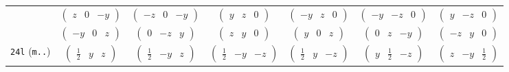 \documentclass[fleqn,9pt,landscape]{jsarticle}
\begin{document}
\begin{center}
\begin{longtable}{ccccccc}
& $ \begin{pmatrix} z & 0 & - y \end{pmatrix} $ & $ \begin{pmatrix} - z & 0 & - y \end{pmatrix} $ & $ \begin{pmatrix} y & z & 0 \end{pmatrix} $ & $ \begin{pmatrix} - y & z & 0 \end{pmatrix} $ & $ \begin{pmatrix} - y & - z & 0 \end{pmatrix} $ & $ \begin{pmatrix} y & - z & 0 \end{pmatrix} $ \\
& $ \begin{pmatrix} - y & 0 & z \end{pmatrix} $ & $ \begin{pmatrix} 0 & - z & y \end{pmatrix} $ & $ \begin{pmatrix} z & y & 0 \end{pmatrix} $ & $ \begin{pmatrix} y & 0 & z \end{pmatrix} $ & $ \begin{pmatrix} 0 & z & - y \end{pmatrix} $ & $ \begin{pmatrix} - z & y & 0 \end{pmatrix} $ \\ \hline
{\tt 24l} ({\tt m..}) & $ \begin{pmatrix} \frac{1}{2} & y & z \end{pmatrix} $ & $ \begin{pmatrix} \frac{1}{2} & - y & z \end{pmatrix} $ & $ \begin{pmatrix} \frac{1}{2} & - y & - z \end{pmatrix} $ & $ \begin{pmatrix} \frac{1}{2} & y & - z \end{pmatrix} $ & $ \begin{pmatrix} y & \frac{1}{2} & - z \end{pmatrix} $ & $ \begin{pmatrix} z & - y & \frac{1}{2} \end{pmatrix} $ \\

\end{longtable}
\end{center}
\end{document}
